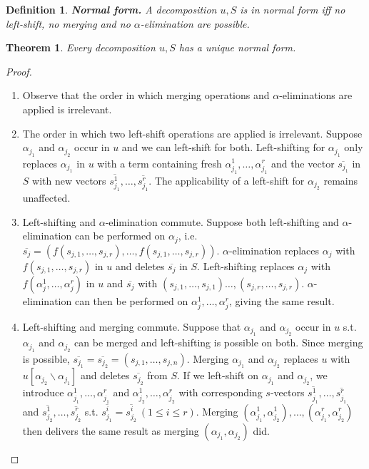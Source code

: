 \documentclass[a4paper, 11pt]{report}
\newtheorem{theorem}{Theorem}
\newtheorem{definition}{Definition}
\begin{document}
\begin{definition} \textbf{Normal form.} A decomposition $u,S$ is in normal form iff no left-shift, no merging and no $\alpha$-elimination are possible.
\end{definition}

\begin{theorem}Every decomposition $u,S$ has a unique normal form. \label{thm:uniqueNormalForm}\end{theorem}

\begin{proof}
  \begin{enumerate}
    \item Observe that the order in which merging operations and $\alpha$-eliminations are applied is irrelevant. 
    \item The order in which two left-shift operations are applied is irrelevant. Suppose $\alpha_{j_1}$ and $\alpha_{j_2}$ occur in $u$ and
          we can left-shift for both. Left-shifting for $\alpha_{j_1}$ only replaces $\alpha_{j_1}$ in $u$ with a term containing fresh
          $\alpha_{j_1}^1,\dots,\alpha_{j_1}^r$ and the vector $\overline{s_{j_1}}$ in $S$ with new vectors $\overline{s_{j_1}^1},\dots,\overline{s_{j_1}^r}$.
          The applicability of a left-shift for $\alpha_{j_2}$ remains unaffected.
    \item Left-shifting and $\alpha$-elimination commute.
          Suppose both left-shifting and $\alpha$-elimination can be performed on $\alpha_j$, i.e.\\
          $\overline{s_j} = (f(s_{j,1},\dots,s_{j,r}),\dots,f(s_{j,1},\dots,s_{j,r}))$.
          $\alpha$-elimination replaces $\alpha_j$ with $f(s_{j,1},\dots,s_{j,r})$ in $u$ and deletes $\overline{s_j}$ in $S$.
          Left-shifting replaces $\alpha_j$ with $f(\alpha_j^1,\dots,\alpha_j^r)$ in $u$ and $\overline{s_j}$ with $(s_{j,1},\dots,s_{j,1})\dots,(s_{j,r},\dots,s_{j,r})$.
          $\alpha$-elimination can then be performed on $\alpha_j^1,\dots,\alpha_j^r$, giving the same result.
    \item Left-shifting and merging commute. Suppose that $\alpha_{j_1}$ and $\alpha_{j_2}$ occur in $u$ s.t. $\alpha_{j_1}$ and $\alpha_{j_2}$
          can be merged and left-shifting is possible on both.
          Since merging is possible, $\overline{s_{j_1}} = \overline{s_{j_2}} = (s_{j,1},\dots,s_{j,n})$. Merging $\alpha_{j_1}$ and $\alpha_{j_2}$ replaces $u$
          with $u[\alpha_{j_2}\backslash \alpha_{j_1}]$ and deletes $\overline{s_{j_2}}$ from $S$.
          If we left-shift on $\alpha_{j_1}$ and $\alpha_{j_2}$, we introduce $\alpha_{j_1}^1,\dots,\alpha_{j_1}^r$ and $\alpha_{j_2}^1,\dots,\alpha_{j_2}^r$
          with corresponding $s$-vectors $\overline{s_{j_1}^1},\dots,\overline{s_{j_1}^r}$ and $\overline{s_{j_2}^1},\dots,\overline{s_{j_2}^r}$
          s.t. $\overline{s_{j_1}^i} = \overline{s_{j_2}^i}\ (1 \leq i \leq r)$.
          Merging $(\alpha_{j_1}^1, \alpha_{j_2}^1), \dots, (\alpha_{j_1}^r, \alpha_{j_2}^r)$ then delivers the same result as merging $(\alpha_{j_1},\alpha_{j_2})$ did. 
  \end{enumerate}
\end{proof}
\end{document}
